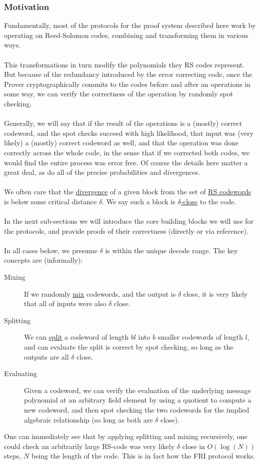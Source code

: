 \documentclass[10pt,letterpaper,titlepage]{article}
\newcommand{\dd}[0]{\delta}
\theoremstyle{definition}
\begin{document}
\begin{appendices}
\subsubsection{Motivation}
Fundamentally, most of the protocols for the proof system described here work by operating on Reed-Solomon codes, combining and transforming them in various ways.\\
\\
This transformations in turn modify the polynomials they RS codes represent.
But because of the redundancy introduced by the error correcting code, once the Prover cryptographically commits to the codes before and after an operations in some way, we can verify the correctness of the operation by randomly spot checking.\\
\\
Generally, we will say that if the result of the operations is a (mostly) correct codeword, and the spot checks succeed with high likelihood, that input was (very likely) a (mostly) correct codeword as well, and that the operation was done correctly across the whole code, in the sense that if we corrected both codes, we would find the entire process was error free.
Of course the details here matter a great deal, as do all of the precise probabilities and divergences.\\
\\
We often care that the \hyperref[divergence]{divergence} of a given block from the set of \hyperref[codeword]{RS codewords} is below some critical distance $\dd$.
We say such a block is \hyperref[delta-close]{$\dd$-close} to the code.\\
\\
In the next sub-sections we will introduce the core building blocks we will use for the protocols, and provide proofs of their correctness (directly or via reference).\\
\\
In all cases below, we presume $\dd$ is within the unique decode range.
The key concepts are (informally):
\begin{description}
  \item[Mixing] If we randomly \hyperref[mix]{mix} codewords, and the output is $\dd$ close, it is very likely that all of inputs were also $\dd$ close.
  \item[Splitting] We can \hyperref[split]{split} a codeword of length $bl$ into $b$ smaller codewords of length $l$, and can evaluate the split is correct by spot checking, so long as the outputs are all $\dd$ close.
  \item[Evaluating] Given a codeword, we can verify the evaluation of the underlying message polynomial at an arbitrary field element by using a quotient to compute a new codeword, and then spot checking the two codewords for the implied algebraic relationship (so long as both are $\dd$ close).
\end{description}
\noindent
One can immediately see that by applying splitting and mixing recursively, one could check an arbitrarily large RS-code was very likely $\dd$ close in $O(\log(N))$ steps, $N$ being the length of the code.
This is in fact how the FRI protocol works.

\end{appendices}
\end{document}
